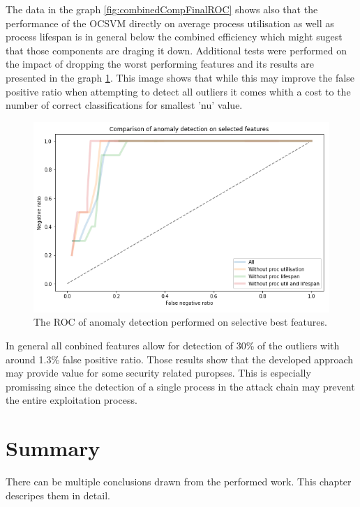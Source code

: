 \documentclass[a4paper,twoside,12pt]{book}
\begin{document}
The data in the graph \ref{fig:combinedCompFinalROC} shows also that the performance of the OCSVM directly on average process utilisation
as well as process lifespan is in general below the combined efficiency which might sugest that those components are draging it down. 
Additional tests were performed on the impact of dropping the worst performing features and its results are presented in the graph \ref{fig:combinedCompFinalROCDroping}. 
This image shows that while this may improve the false positive ratio when attempting to detect all outliers it comes whith 
a cost to the number of correct classifications for smallest 'nu' value.

\begin{figure}
	\centering
	\includegraphics[scale=0.9]{images/CombinedFinalROCDroping}
	\caption{The ROC of anomaly detection performed on selective best features.}
	\label{fig:combinedCompFinalROCDroping}
 \end{figure}

In general all conbined features allow for detection of 30\% of the outliers with around 1.3\% false positive ratio. 
Those results show that the developed approach may provide value for some security related puropses. This is especially
promissing since the detection of a single process in the attack chain may prevent the entire exploitation process.



\chapter{Summary}

There can be multiple conclusions drawn from the performed work. This chapter descripes them in 
detail.
\end{document}
